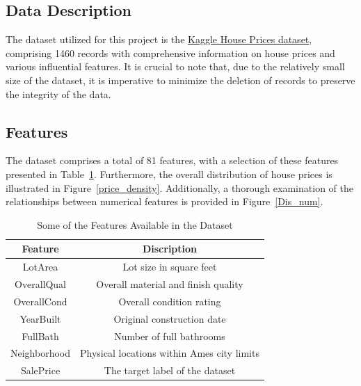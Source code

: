 \documentclass{article}
\begin{document}
\subsection{Data Description}
The dataset utilized for this project is the \href{https://www.kaggle.com/code/shayanshahrabi/house-prices-prediction-using-tfdf/edit}{Kaggle House Prices dataset}, comprising 1460 records with comprehensive information on house prices and various influential features. It is crucial to note that, due to the relatively small size of the dataset, it is imperative to minimize the deletion of records to preserve the integrity of the data.


\subsection{Features}
The dataset comprises a total of 81 features, with a selection of these features presented in Table~\ref{table_01}. Furthermore, the overall distribution of house prices is illustrated in Figure~\ref{price_density}. Additionally, a thorough examination of the relationships between numerical features is provided in Figure~\ref{Dis_num}.

\begin{table}
    \centering
    \begin{tabular}{|c|c|} \hline 
         Feature& Discription\\ \hline 
         LotArea& Lot size in square feet\\ \hline 
         OverallQual& Overall material and finish quality\\ \hline 
         OverallCond& Overall condition rating\\ \hline 
         YearBuilt& Original construction date\\ \hline 
         FullBath& Number of full bathrooms\\ \hline 
         Neighborhood& Physical locations within Ames city limits\\ \hline 
         SalePrice& The target label of the dataset\\ \hline
    \end{tabular}
    \caption{Some of the Features Available in the Dataset}
    \label{table_01}
\end{table}
\end{document}
